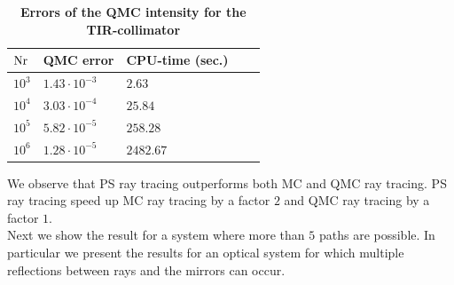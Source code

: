 \begin{table}[h!] 
\centering
\caption{\bf Errors of the QMC intensity for the TIR-collimator}
\begin{tabular}{lllll}
 \hline  $\textrm{Nr}$\;  & QMC error  & CPU-time (sec.)\\
  \hline 
 $10^3$   & $1.43\cdot10^{-3}$    & $2.63$  \\
$10^4$    & $3.03\cdot 10^{-4}$   & $25.84$   \\
$10^5$    & $5.82\cdot 10^{-5}$   & $258.28$  \\
 $10^6$   & $1.28\cdot 10^{-5}$   & $2482.67$  \\
 \hline
 \end{tabular}
 \label{tab:qmc_error_triangulation}
 \end{table}
We observe that PS ray tracing outperforms both MC and QMC ray tracing. PS ray tracing speed up MC ray tracing by a factor $2$ and QMC ray tracing by a factor $1$.\\ \indent Next we show the result for a system where more than $5$ paths are possible. 
In particular we present the results for an optical system for which multiple reflections between rays and the mirrors can occur.
